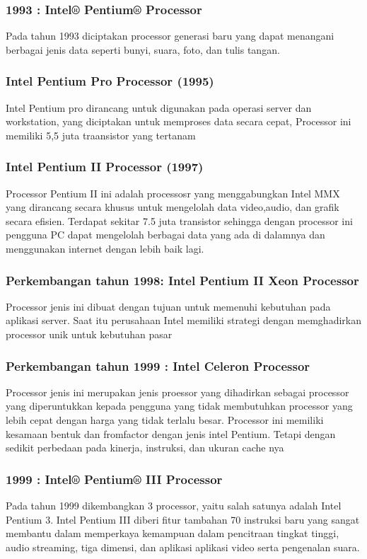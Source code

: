  			\subsubsection {1993 : Intel® Pentium® Processor}
 	Pada tahun 1993 diciptakan processor generasi baru yang dapat menangani berbagai jenis data seperti bunyi, suara, foto, dan tulis tangan.


 			\subsubsection{Intel Pentium Pro Processor (1995)}
 	Intel Pentium pro dirancang untuk digunakan pada operasi server dan workstation, yang diciptakan untuk memproses data secara cepat, Processor ini memiliki 5,5 juta traansistor yang tertanam
 			\subsubsection{Intel Pentium II Processor (1997)}	
 	Processor Pentium II ini adalah processosr yang menggabungkan Intel MMX yang dirancang secara khusus untuk mengelolah data video,audio, dan grafik secara efisien. Terdapat sekitar 7.5 juta transistor sehingga dengan processor ini pengguna PC dapat mengelolah berbagai data yang ada di dalamnya dan menggunakan internet dengan lebih baik lagi.


 			\subsubsection{Perkembangan tahun 1998: Intel Pentium II Xeon Processor}
 	Processor jenis ini dibuat dengan tujuan untuk memenuhi kebutuhan pada aplikasi server. Saat itu perusahaan Intel memiliki strategi dengan memghadirkan processor unik untuk kebutuhan pasar
 			\subsubsection{Perkembangan tahun 1999 : Intel Celeron Processor}
 	Processor jenis ini merupakan jenis proessor yang dihadirkan sebagai processor yang diperuntukkan kepada pengguna yang tidak membutuhkan processor yang lebih cepat dengan harga yang tidak terlalu besar. Processor ini memiliki kesamaan bentuk dan fromfactor dengan jenis intel Pentium. Tetapi dengan sedikit perbedaan pada kinerja, instruksi, dan ukuran cache nya


 			\subsubsection{1999 : Intel® Pentium® III Processor}
 	Pada tahun 1999 dikembangkan 3 processor, yaitu salah satunya adalah Intel Pentium 3. Intel Pentium III diberi fitur tambahan 70 instruksi baru yang sangat membantu dalam memperkaya kemampuan dalam pencitraan tingkat tinggi, audio streaming, tiga dimensi, dan aplikasi aplikasi video serta pengenalan suara. 
